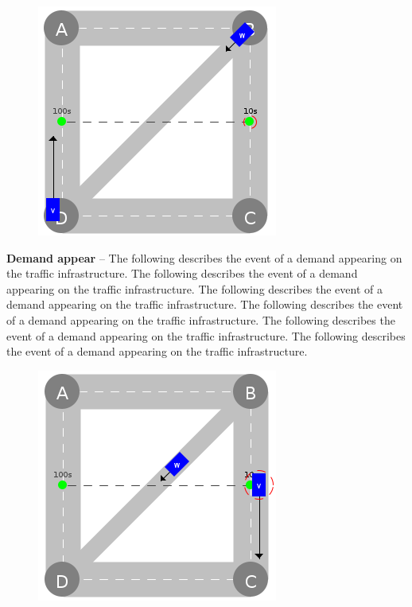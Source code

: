 \documentclass[graybox]{svmult}
\begin{document}
\begin{figure}
	\centering
		\includegraphics[scale=0.35]{../../events/demand.png}
\end{figure}

\noindent
\textbf{Demand appear}
--
The following describes the event of a demand appearing on the traffic infrastructure.
The following describes the event of a demand appearing on the traffic infrastructure.
The following describes the event of a demand appearing on the traffic infrastructure.
The following describes the event of a demand appearing on the traffic infrastructure.
The following describes the event of a demand appearing on the traffic infrastructure.
The following describes the event of a demand appearing on the traffic infrastructure.

\vspace{4mm}

\begin{figure}
	\centering
	\includegraphics[scale=0.35]{../../events/vehicle-at-demand-pick-up.png}
\end{figure}
\end{document}
